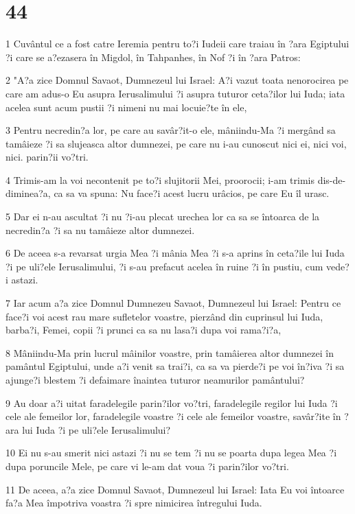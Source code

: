 \chapter{44}

\par 1 Cuvântul ce a fost catre Ieremia pentru to?i Iudeii care traiau în ?ara Egiptului ?i care se a?ezasera în Migdol, în Tahpanhes, în Nof ?i în ?ara Patros:
\par 2 "A?a zice Domnul Savaot, Dumnezeul lui Israel: A?i vazut toata nenorocirea pe care am adus-o Eu asupra Ierusalimului ?i asupra tuturor ceta?ilor lui Iuda; iata acelea sunt acum pustii ?i nimeni nu mai locuie?te în ele,
\par 3 Pentru necredin?a lor, pe care au savâr?it-o ele, mâniindu-Ma ?i mergând sa tamâieze ?i sa slujeasca altor dumnezei, pe care nu i-au cunoscut nici ei, nici voi, nici. parin?ii vo?tri.
\par 4 Trimis-am la voi necontenit pe to?i slujitorii Mei, proorocii; i-am trimis dis-de-diminea?a, ca sa va spuna: Nu face?i acest lucru urâcios, pe care Eu îl urasc.
\par 5 Dar ei n-au ascultat ?i nu ?i-au plecat urechea lor ca sa se întoarca de la necredin?a ?i sa nu tamâieze altor dumnezei.
\par 6 De aceea s-a revarsat urgia Mea ?i mânia Mea ?i s-a aprins în ceta?ile lui Iuda ?i pe uli?ele Ierusalimului, ?i s-au prefacut acelea în ruine ?i în pustiu, cum vede?i astazi.
\par 7 Iar acum a?a zice Domnul Dumnezeu Savaot, Dumnezeul lui Israel: Pentru ce face?i voi acest rau mare sufletelor voastre, pierzând din cuprinsul lui Iuda, barba?i, Femei, copii ?i prunci ca sa nu lasa?i dupa voi rama?i?a,
\par 8 Mâniindu-Ma prin lucrul mâinilor voastre, prin tamâierea altor dumnezei în pamântul Egiptului, unde a?i venit sa trai?i, ca sa va pierde?i pe voi în?iva ?i sa ajunge?i blestem ?i defaimare înaintea tuturor neamurilor pamântului?
\par 9 Au doar a?i uitat faradelegile parin?ilor vo?tri, faradelegile regilor lui Iuda ?i cele ale femeilor lor, faradelegile voastre ?i cele ale femeilor voastre, savâr?ite în ?ara lui Iuda ?i pe uli?ele Ierusalimului?
\par 10 Ei nu s-au smerit nici astazi ?i nu se tem ?i nu se poarta dupa legea Mea ?i dupa poruncile Mele, pe care vi le-am dat voua ?i parin?ilor vo?tri.
\par 11 De aceea, a?a zice Domnul Savaot, Dumnezeul lui Israel: Iata Eu voi întoarce fa?a Mea împotriva voastra ?i spre nimicirea întregului Iuda.
